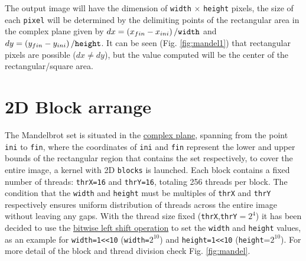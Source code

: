 \documentclass{article}
\begin{document}
The output image will have the dimension of \verb|width| $\times$ \verb|height|
pixels, the size of each \texttt{pixel} will be determined by the delimiting
points of the rectangular area in the complex plane given by $dx=\left( x_{fin}
- x_{ini} \right) / \verb|width|$ and $dy=\left( y_{fin} - y_{ini} \right)/
\verb|height|$. It can be seen (Fig. \ref{fig:mandel1}) that rectangular
pixels are possible ($dx\neq dy$), but the value computed will be the center
of the rectangular/square area.

\section*{2D Block arrange}
The Mandelbrot set is situated in the
\href{https://en.wikipedia.org/wiki/Complex_plane}{complex plane}, spanning
from the point \verb|ini| to \verb|fin|, where the coordinates of \verb|ini|
and \verb|fin| represent the lower and upper bounds of the rectangular region
that contains the set respectively, to cover the entire image, a kernel with 2D
\verb|blocks| is launched. Each block contains a fixed number of threads:
\verb|thrX=16| and \verb|thrY=16|, totaling 256 threads per block. The
condition that the \verb|width| and \verb|height| must be multiples of
\verb|thrX| and \verb|thrY| respectively ensures uniform distribution of
threads across the entire image without leaving any gaps.  With the thread size
fixed (\verb|thrX|,\verb|thrY|$=2^4$) it has been decided to use the  
\href{https://en.wikipedia.org/wiki/Bitwise_operations_in_C}{bitwise left
shift operation} to set the \verb|width| and \verb|height| values, as an
example for \verb|width=1<<10| (\verb|width=|$2^{10}$) and \verb|height=1<<10|
(\verb|height|=$2^{10}$).  For more detail of the block and
thread division check Fig. \ref{fig:mandel}.
\end{document}
